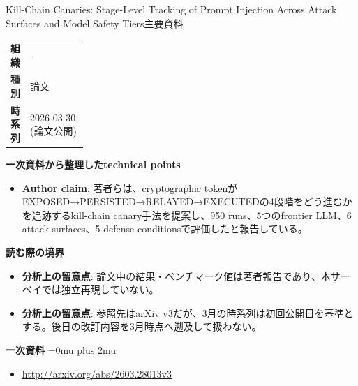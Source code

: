 \begin{technicalnote}{Kill-Chain Canaries: Stage-Level Tracking of Prompt Injection Across Attack Surfaces and Model Safety Tiers}{主要資料}
\begingroup
\begin{tabularx}{\linewidth}{@{}>{\bfseries}p{0.22\linewidth}X@{}}
組織 & - \\
種別 & 論文 \\
時系列 & 2026-03-30 (論文公開) \\
\end{tabularx}
\smallskip
{\bfseries 一次資料から整理したtechnical points}
\begin{itemize}[leftmargin=1.5em,itemsep=0.35em]
\item \textbf{Author claim}: 著者らは、cryptographic tokenがEXPOSED→PERSISTED→RELAYED→EXECUTEDの4段階をどう進むかを追跡するkill-chain canary手法を提案し、950 runs、5つのfrontier LLM、6 attack surfaces、5 defense conditionsで評価したと報告している。
\end{itemize}
\begin{minipage}{\linewidth}
{\bfseries 読む際の境界}
\begin{itemize}[leftmargin=1.5em,itemsep=0.35em]
\item \textbf{分析上の留意点}: 論文中の結果・ベンチマーク値は著者報告であり、本サーベイでは独立再現していない。
\item \textbf{分析上の留意点}: 参照先はarXiv v3だが、3月の時系列は初回公開日を基準とする。後日の改訂内容を3月時点へ遡及して扱わない。
\end{itemize}
\begin{samepage}
{\bfseries 一次資料}
\begingroup\sloppy
\Urlmuskip=0mu plus 2mu\relax
\begin{itemize}[leftmargin=1.5em,itemsep=0.25em]
\item {\scriptsize\url{http://arxiv.org/abs/2603.28013v3}}
\end{itemize}
\endgroup
\end{samepage}
\end{minipage}
\endgroup
\end{technicalnote}
\medskip

